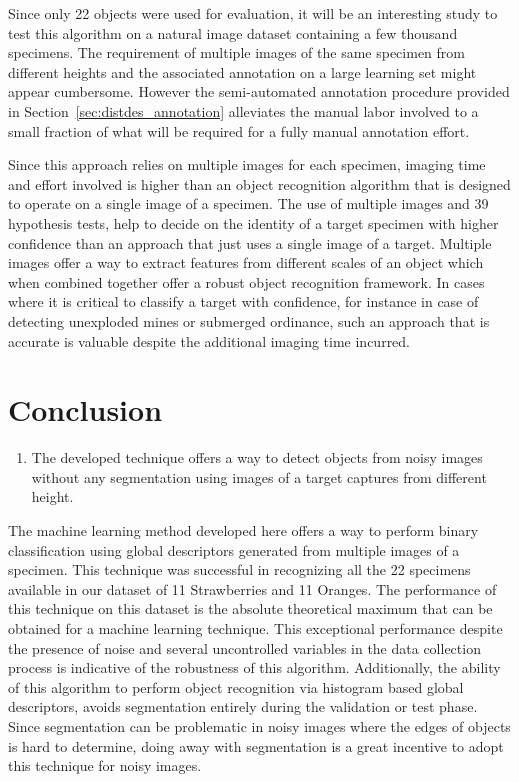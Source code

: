 \documentclass {udthesis}
\begin{document}
Since only 22 objects were used for evaluation, it will be an interesting study to test this algorithm on a natural image dataset containing a few thousand specimens. The requirement of multiple images of the same specimen from different heights and the associated annotation on a large learning set might appear cumbersome. However the semi-automated annotation procedure provided in Section~\ref{sec:distdes_annotation} alleviates the manual labor involved to a small fraction of what will be required for a fully manual annotation effort.

Since this approach relies on multiple images for each specimen, imaging time and effort involved is higher than an object recognition algorithm that is designed to operate on a single image of a specimen. The use of multiple images and 39 hypothesis tests, help to decide on the identity of a target specimen with higher confidence than an approach that just uses a single image of a target. Multiple images offer a way to extract features from different scales of an object which when combined together offer a robust object recognition framework. In cases where it is critical to classify a target with confidence, for instance in case of detecting unexploded mines or submerged ordinance, such an approach that is accurate is  valuable despite the additional imaging time incurred.

\section{Conclusion}
\begin{enumerate}
        \item The developed technique offers a way to detect objects from noisy images without any segmentation using images of a target captures from different height.
\end{enumerate}

The machine learning method developed here offers a way to perform binary classification using global descriptors generated from multiple images of a specimen. This technique was successful in recognizing all the 22 specimens available in our dataset of 11 Strawberries and 11 Oranges. The performance of this technique on this dataset is the absolute theoretical maximum that can be obtained for a machine learning technique. This exceptional performance despite the presence of noise and several uncontrolled variables in the data collection process is indicative of the robustness of this algorithm. Additionally, the ability of this algorithm to perform object recognition via histogram based global descriptors, avoids segmentation entirely during the validation or test phase. Since segmentation can be problematic in noisy images where the edges of objects is hard to determine, doing away with segmentation is a great incentive to adopt this technique for noisy images.
\end{document}
